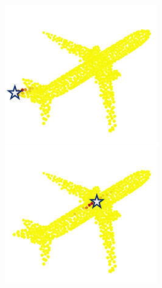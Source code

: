 \documentclass[letterpaper]{article}
\begin{document}
\begin{figure}[htbp]
\begin{center}
\begin{minipage}[b]{0.8\linewidth}
\begin{center}
\begin{minipage}[b]{0.12\linewidth}
\begin{center}
\includegraphics[width=1.0\linewidth]{images/atten_pic/dgcnn_airplane_feature_1.png}
\end{center}
\end{minipage}
\begin{minipage}[b]{0.12\linewidth}
\begin{center}
\includegraphics[width=1.0\linewidth]{images/atten_pic/dgcnn_airplane_feature_2.png}

\end{center}
\end{minipage}
\end{center}
\end{minipage}
\end{center}
\end{figure}
\end{document}
